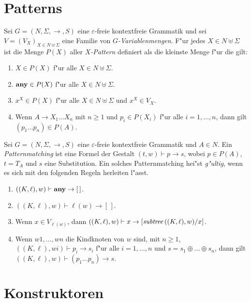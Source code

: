 \documentclass[12pt,a4paper]{article}
\begin{document}
\section{Patterns}

\begin{definition}[Patterns]
  Sei $G = (N,\Sigma,\to,S)$ eine $\varepsilon$-freie kontextfreie Grammatik und sei
  $V = (V_X)_{X\in N \uplus \Sigma}$ eine Familie von \emph{$G$-Variablenmengen}. F"ur
  jedes $X \in N \uplus \Sigma$ ist die Menge $P(X)$ aller \emph{$X$-Pattern}
  definiert als die kleinste Menge f"ur die gilt:
  \begin{enumerate}
  \item $X \in P(X)$ f"ur alle $X \in N \uplus \Sigma$.
  \item $\mathbf{any} \in P(X)$ f"ur alle $X \in N \uplus \Sigma$.
  \item $x^X \in P(X)$ f"ur alle $X \in N \uplus \Sigma$ und $x^X \in V_X$.
  \item Wenn $A \to X_1 \ldots X_n$ mit $n \ge 1$ und $p_i \in P(X_i)$ f"ur alle $i=1,\ldots,n$,
    dann gilt $(p_1 \ldots p_n) \in P(A)$.
  \end{enumerate}
\end{definition}

\begin{definition}[Patternmatching]
  Sei $G = (N,\Sigma,\to,S)$ eine $\varepsilon$-freie kontextfreie Grammatik und
  $A \in N$. Ein \emph{Patternmatching} ist eine Formel der Gestalt $(t,w) \vdash p \to s$,
  wobei $p \in P(A)$, $t = T_A$ und $s$ eine Substitution. Ein solches
  Patternmatching hei"st \emph{g"ultig}, wenn es sich mit den folgenden Regeln herleiten
  l"asst.
  \begin{enumerate}
  \item $((K,\ell),w) \vdash \mathbf{any} \to [\,]$.
  \item $((K,\ell),w) \vdash \ell(w) \to [\,]$.
  \item Wenn $x \in V_{\ell(w)}$, dann $((K,\ell),w) \vdash x \to [\mathit{subtree}\,((K,\ell),w)/x]$.
  \item Wenn $w1,\ldots,wn$ die Kindknoten von $w$ sind, mit $n \ge 1$, $((K,\ell),wi) \vdash p_i \to s_i$ f"ur alle
    $i=1,\ldots,n$ und $s = s_1 \oplus \ldots \oplus s_n$, dann gilt $((K,\ell),w) \vdash (p_1 \ldots p_n) \to s$.
  \end{enumerate}
\end{definition}


\section{Konstruktoren}
\end{document}
